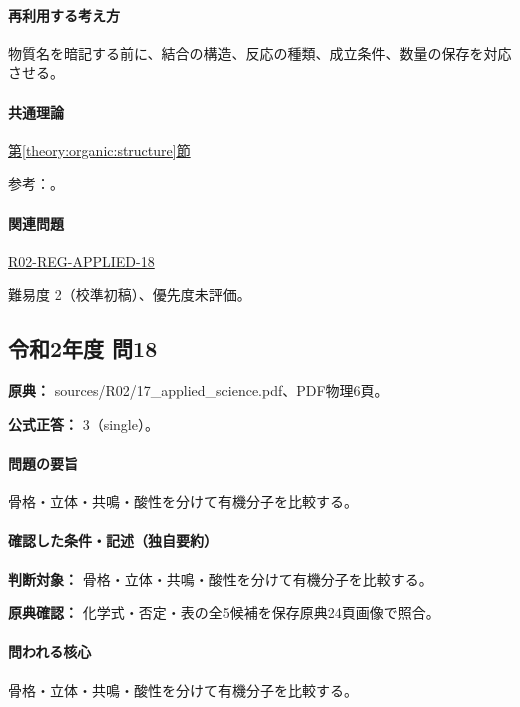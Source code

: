 \paragraph{再利用する考え方} 物質名を暗記する前に、結合の構造、反応の種類、成立条件、数量の保存を対応させる。

\paragraph{共通理論} \hyperref[theory:organic:structure]{第\ref*{theory:organic:structure}節}

\par 参考：\cite{organic_chirality,organic_benzene}。

\paragraph{関連問題} \hyperref[q:r02-reg-applied-18]{R02-REG-APPLIED-18}

\par 難易度 2（校準初稿）、優先度未評価。

\subsection{令和2年度 問18}
\label{q:r02-reg-applied-18}

\noindent\textbf{原典：} sources/R02/17\_applied\_science.pdf、PDF物理6頁。

\textbf{公式正答：} 3（single）。

\paragraph{問題の要旨} 骨格・立体・共鳴・酸性を分けて有機分子を比較する。

\paragraph{確認した条件・記述（独自要約）}\mbox{}\par

\noindent\textbf{判断対象：} 骨格・立体・共鳴・酸性を分けて有機分子を比較する。\par

\noindent\textbf{原典確認：} 化学式・否定・表の全5候補を保存原典24頁画像で照合。\par

\paragraph{問われる核心} 骨格・立体・共鳴・酸性を分けて有機分子を比較する。

